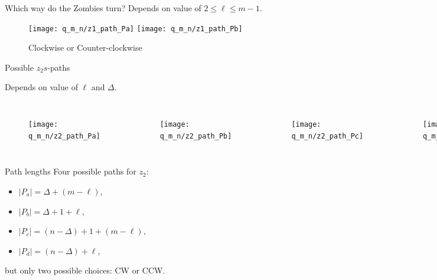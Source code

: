 \begin{frame}{Which way do the Zombies turn?}
Depends on value of $2 \leq \ell \leq m-1$.
\begin{figure}
\centering
\texttt{[image: q\_m\_n/z1\_path\_Pa]}
\texttt{[image: q\_m\_n/z1\_path\_Pb]}
\caption{Clockwise or Counter-clockwise}
\end{figure}
\end{frame}

\begin{frame}{Possible $z_2s$-paths}

Depends on value of $\ell$ and $\Delta$.
\begin{columns}[onlytextwidth, T]
\begin{figure}
\texttt{[image: q\_m\_n/z2\_path\_Pa]}
\end{figure}
\begin{figure}
\texttt{[image: q\_m\_n/z2\_path\_Pb]}
\end{figure}

\begin{figure}
\texttt{[image: q\_m\_n/z2\_path\_Pc]}
\end{figure}
\begin{figure}
\texttt{[image: q\_m\_n/z2\_path\_Pd]}
\end{figure}
\end{columns}
\end{frame}

\begin{frame}{Path lengths}
Four possible paths for $z_2$:
\vspace{1cm}
\begin{itemize}
\item $|P_a| = \Delta + (m - \ell)$,
\item $|P_b| = \Delta + 1 + \ell$,
\item $|P_c| = (n-\Delta) + 1 + (m-\ell)$,
\item $|P_d| = (n-\Delta) + \ell$,
\end{itemize}

\vspace{1cm}
but only two possible choices: CW or CCW.

\end{frame}

